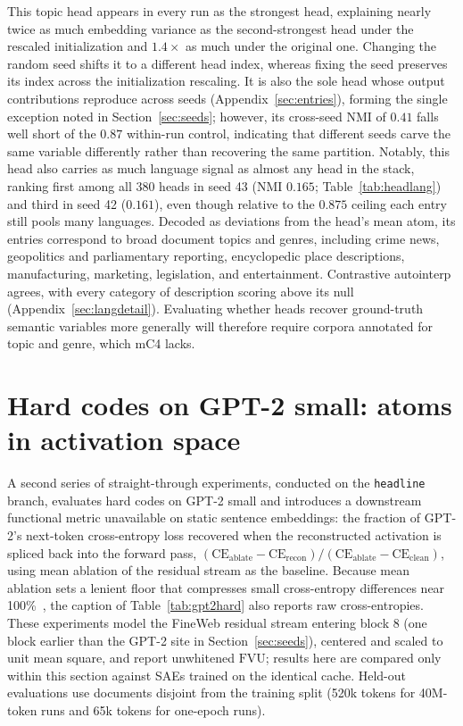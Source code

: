 This topic head appears in every run as the strongest head, explaining
nearly twice as much embedding variance as the second-strongest head
under the rescaled initialization and $1.4\times$ as much under the
original one. Changing the random seed
shifts it to a different head index, whereas fixing the seed preserves its
index across the initialization rescaling. It is also the sole head whose
output contributions reproduce across seeds (Appendix~\ref{sec:entries}),
forming the single exception noted in Section~\ref{sec:seeds}; however, its
cross-seed NMI of $0.41$ falls well short of the $0.87$ within-run control,
indicating that different seeds carve the same variable
differently rather than recovering the same partition. Notably, this head
also carries as much language signal as almost any head in the stack,
ranking first among all 380 heads in seed 43 (NMI $0.165$;
Table~\ref{tab:headlang}) and third in seed 42 ($0.161$), even though
relative to the $0.875$ ceiling each entry still pools many languages.
Decoded as deviations from the head's mean atom, its entries correspond to
broad document topics and genres, including crime news, geopolitics and
parliamentary reporting, encyclopedic place descriptions, manufacturing,
marketing, legislation, and entertainment. Contrastive autointerp
agrees, with every category of description scoring above
its null (Appendix~\ref{sec:langdetail}). Evaluating whether heads recover
ground-truth semantic variables more generally will therefore require
corpora annotated for topic and genre, which mC4 lacks.

\section{Hard codes on GPT-2 small: atoms in activation space}
\label{sec:gpt2hard}

A second series of straight-through experiments, conducted on the
\texttt{headline} branch, evaluates hard codes on GPT-2 small and introduces
a downstream functional metric unavailable on static sentence embeddings: the
fraction of GPT-2's next-token cross-entropy loss recovered when the
reconstructed activation is spliced back into the forward pass,
$(\mathrm{CE}_{\mathrm{ablate}} - \mathrm{CE}_{\mathrm{recon}})
/(\mathrm{CE}_{\mathrm{ablate}} - \mathrm{CE}_{\mathrm{clean}})$, using mean
ablation of the residual stream as the baseline. Because mean ablation sets a
lenient floor that compresses small cross-entropy differences near
100\%~\cite{gao2024}, the caption of Table~\ref{tab:gpt2hard} also reports
raw cross-entropies. These experiments model the FineWeb residual stream
entering block 8 (one block earlier than the GPT-2 site in
Section~\ref{sec:seeds}), centered and scaled to unit mean square, and report
unwhitened $\mathrm{FVU}$; results here are compared only within this section
against SAEs trained on the identical cache. Held-out evaluations use
documents disjoint from the training split (520k tokens for 40M-token runs
and 65k tokens for one-epoch runs).

